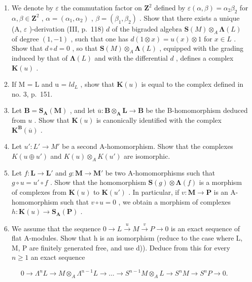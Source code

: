 \begin{enumerate}
\def\labelenumi{\alph{enumi})}
\item
  We denote by \(\varepsilon\) the commutation factor on \(\mathbf{Z}^2\) defined by \(\varepsilon(\alpha, \beta) = \alpha_2 \beta_2\) for \(\alpha, \beta \in \mathbf{Z}^2\) , \(\alpha = (\alpha_1, \alpha_2)\) , \(\beta = (\beta_1, \beta_2)\) . Show that there exists a unique (A, \(\varepsilon\) )-derivation (III, p.~118) \(d\) of the bigraded algebra \(\mathbf{S}(M) \otimes_A \symbf{\Lambda}(L)\) of degree \((1, -1)\) , such that one has \(d(1 \otimes x) = u(x) \otimes 1\) for \(x \in L\) . Show that \(d \circ d = 0\) , so that \(\mathbf{S}(M) \otimes_A \symbf{\Lambda}(L)\) , equipped with the grading induced by that of \(\symbf{\Lambda}(L)\) and with the differential \(d\) , defines a complex \(\mathbf{K}(u)\) .
\item
  If M = L and u = \(ld_{L}\) , show that \(\mathbf{K}(u)\) is equal to the complex defined in no. 3, p.~151.
\item
  Let \(\mathbf{B} = \mathbf{S}_{\mathbf{A}}(\mathbf{M})\) , and let \(\overline{u}: \mathbf{B} \otimes_{\mathbf{A}} \mathbf{L} \to \mathbf{B}\) be the B-homomorphism deduced from \(u\) . Show that \(\mathbf{K}(u)\) is canonically identified with the complex \(\mathbf{K}^{\mathbf{B}}(\overline{u})\) .
\item
  Let \(u': L' \to M'\) be a second A-homomorphism. Show that the complexes \(K(u \oplus u')\) and \(K(u) \otimes_{A} K(u')\) are isomorphic.
\item
  Let \(f: \mathbf{L} \to \mathbf{L}'\) and \(g: \mathbf{M} \to \mathbf{M}'\) be two A-homomorphisms such that \(g \circ u = u' \circ f\) . Show that the homomorphism \(\mathbf{S}(g) \otimes \symbf{\Lambda}(f)\) is a morphism of complexes from \(\mathbf{K}(u)\) to \(\mathbf{K}(u')\) . In particular, if \(v: \mathbf{M} \to \mathbf{P}\) is an A-homomorphism such that \(v \circ u = 0\) , we obtain a morphism of complexes \(h: \mathbf{K}(u) \to \mathbf{S}_{\mathbf{A}}(\mathbf{P})\) .
\item
  We assume that the sequence \(0 \rightarrow L \xrightarrow{u} M \xrightarrow{v} P \rightarrow 0\) is an exact sequence of flat A-modules. Show that h is an isomorphism (reduce to the case where L, M, P are finitely generated free, and use d)). Deduce from this for every \(n \geqslant 1\) an exact sequence
\end{enumerate}

\[
0 \rightarrow \Lambda^ {n} L \rightarrow M \otimes_ {A} \Lambda^ {n - 1} L \rightarrow \dots \rightarrow S ^ {n - 1} M \otimes_ {A} L \rightarrow S ^ {n} M \rightarrow S ^ {n} P \rightarrow 0.
\]

